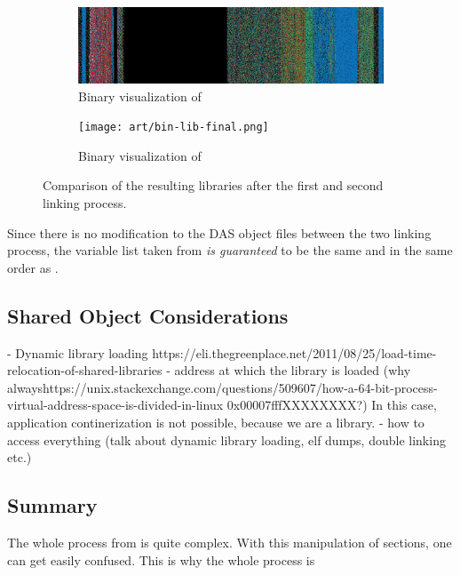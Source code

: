 {\begin{figure}[htbp]
	\centering
	\begin{subfigure}{\linewidth}
		\centering
		\includegraphics[width=\linewidth, keepaspectratio]{art/bin-lib-intermediate.png}
		\caption{Binary visualization of }
		\label{fig:bin-lib-intermediate}
	\end{subfigure}
	\vspace{12pt}
	\begin{subfigure}{\linewidth}
		\centering
		\texttt{[image: art/bin-lib-final.png]}
		\caption{Binary visualization of }
		\label{fig:bin-lib-final}
	\end{subfigure}
	\caption{Comparison of the resulting libraries after the first and second linking process.}
	\label{fig:bin-lib-comp}
\end{figure}

Since there is no modification to the DAS object files between the two linking process, the variable list taken from  \textit{is guaranteed} to be the same and in the same order as . 

\subsection*{Shared Object Considerations}
- Dynamic library loading  https://eli.thegreenplace.net/2011/08/25/load-time-relocation-of-shared-libraries
- address at which the library is loaded (why alwayshttps://unix.stackexchange.com/questions/509607/how-a-64-bit-process-virtual-address-space-is-divided-in-linux 0x00007fffXXXXXXXX?) 
In this case, application continerization is not possible, because we are a library.
- how to access everything (talk about dynamic library loading, elf dumps, double linking etc.)

\subsection*{Summary}
The whole process from is quite complex. With this manipulation of sections, one can get easily confused. This is why the whole process is 
}
